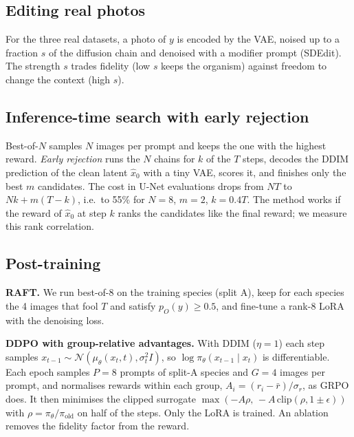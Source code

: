 \subsection{Editing real photos}
For the three real datasets, a photo of $y$ is encoded by the VAE, noised up to a fraction $s$ of the diffusion chain
and denoised with a modifier prompt (SDEdit). The strength $s$ trades fidelity (low $s$ keeps the organism) against
freedom to change the context (high $s$).

\subsection{Inference-time search with early rejection}
Best-of-$N$ samples $N$ images per prompt and keeps the one with the highest reward. \emph{Early rejection} runs the
$N$ chains for $k$ of the $T$ steps, decodes the DDIM prediction of the clean latent $\hat{x}_0$ with a tiny VAE,
scores it, and finishes only the best $m$ candidates. The cost in U-Net evaluations drops from $NT$ to
$Nk+m(T-k)$, i.e.\ to 55\% for $N{=}8$, $m{=}2$, $k{=}0.4T$. The method works if the reward of $\hat{x}_0$ at step
$k$ ranks the candidates like the final reward; we measure this rank correlation.

\subsection{Post-training}
\textbf{RAFT.} We run best-of-8 on the training species (split A), keep for each species the 4 images that fool $T$
and satisfy $p_O(y)\ge 0.5$, and fine-tune a rank-8 LoRA with the denoising loss.

\textbf{DDPO with group-relative advantages.} With DDIM ($\eta=1$) each step samples
$x_{t-1}\sim\mathcal{N}(\mu_\theta(x_t,t),\sigma_t^2 I)$, so $\log\pi_\theta(x_{t-1}\mid x_t)$ is differentiable.
Each epoch samples $P{=}8$ prompts of split-A species and $G{=}4$ images per prompt, and normalises rewards within
each group, $A_i=(r_i-\bar r)/\sigma_r$, as GRPO does. It then minimises the clipped surrogate
$\max(-A\rho,\,-A\,\mathrm{clip}(\rho,1\pm\epsilon))$ with $\rho=\pi_\theta/\pi_{\text{old}}$ on half of the steps.
Only the LoRA is trained. An ablation removes the fidelity factor from the reward.
